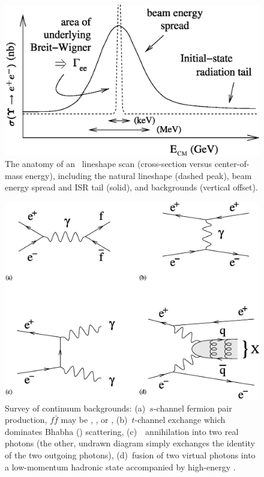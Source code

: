 \documentclass{cornell}
\begin{document}
\begin{figure}[p]
  \begin{center}
    \includegraphics[width=0.7\linewidth]{cartoon}
  \end{center}
  \caption[Anatomy of an \ups\ lineshape scan]{\label{cartoon} The
  anatomy of an \ups\ lineshape scan (cross-section versus
  center-of-mass energy), including the natural lineshape (dashed
  peak), beam energy spread and ISR tail (solid), and backgrounds
  (vertical offset).}
\end{figure}

\begin{figure}[p]
  \begin{center}
    \includegraphics[width=\linewidth]{continuum}
  \end{center}
  \caption[Survey of continuum backgrounds]{\label{continuum} Survey
  of continuum backgrounds: (a)~$s$-channel fermion pair production,
  $f\bar{f}$ may be \qqbar, \mumu, or \tautau, (b)~$t$-channel
  exchange which dominates Bhabha (\ee) scattering, (c)~\ee\
  annihilation into two real photons (the other, undrawn diagram
  simply exchanges the identity of the two outgoing photons),
  (d)~fusion of two virtual photons into a low-momentum hadronic state
  accompanied by high-energy \ee.}
\end{figure}
\end{document}
